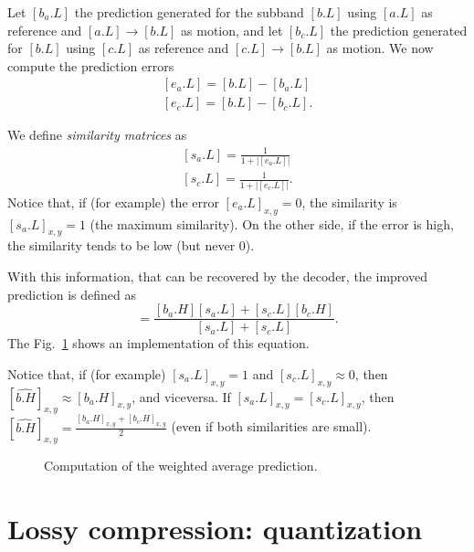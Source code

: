 Let $[b_a.L]$ the prediction generated for the subband $[b.L]$ using
$[a.L]$ as reference and $[a.L]\rightarrow [b.L]$ as motion, and let
$[b_c.L]$ the prediction generated for $[b.L]$ using $[c.L]$ as
reference and $[c.L]\rightarrow [b.L]$ as motion. We now compute the
prediction errors
\begin{equation}
  \begin{array}{l}
    {[e_a.L]} = [b.L] - [b_a.L]\\
    {[e_c.L]} = [b.L] - [b_c.L].
  \end{array}
\end{equation}

We define \emph{similarity matrices} as
\begin{equation}
  \begin{array}{l}
    {[s_a.L]} = \frac{1}{1+{|[e_a.L]|}}\\
    {[s_c.L]} = \frac{1}{1+{|[e_c.L]|}}.    
  \end{array}
  \label{eq:weighted_prediction}
\end{equation}
Notice that, if (for example) the error $[e_a.L]_{x,y}=0$, the
similarity is $[s_a.L]_{x,y}=1$ (the maximum similarity). On the other
side, if the error is high, the similarity tends to be low (but never
$0$).

With this information, that can be recovered by the decoder, the
improved prediction is defined as
\begin{equation}
  [\hat{b.H}] = \frac{[b_a.H][s_a.L]+[s_c.L][b_c.H]}{[s_a.L]+[s_c.L]}.
\end{equation}
The Fig.~\ref{fig:weighted_average} shows an implementation of this
equation.

Notice that, if (for example) $[s_a.L]_{x,y}=1$ and
$[s_c.L]_{x,y}\approx 0$, then
$[\hat{b.H}]_{x,y} \approx [b_a.H]_{x,y}$, and viceversa. If
$[s_a.L]_{x,y}=[s_c.L]_{x,y}$, then
$[\hat{b.H}]_{x,y}=\frac{[b_a.H]_{x,y}+[b_c.H]_{x,y}}{2}$ (even if both similarities are small).

\begin{figure}
  \centering 
  \caption{Computation of the weighted average prediction.}
  \label{fig:weighted_average}
\end{figure}


\section{Lossy compression: quantization}

